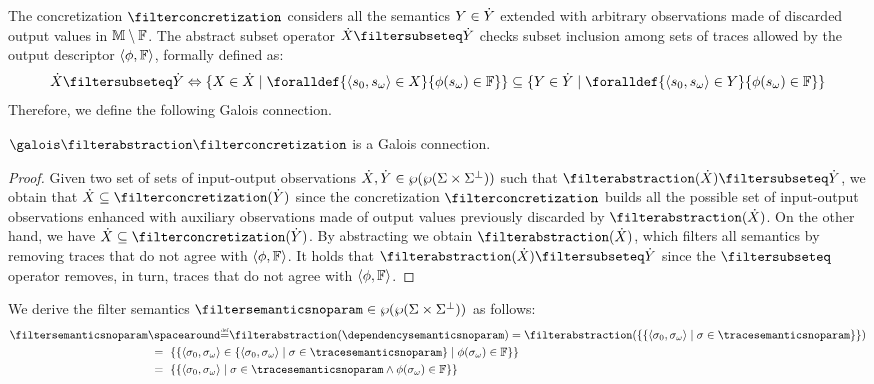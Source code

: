 The concretization $\filterconcretization$ considers all the semantics $Y\in\dot{Y}$ extended with arbitrary observations made of discarded output values in $\mathbb{M}\setminus\mathbb{F}$.
The abstract subset operator $\hiX \filtersubseteq \hiY$ checks subset inclusion among sets of traces allowed by the output descriptor $\langle \phi, \mathbb{F} \rangle$, formally defined as:
\begin{align}
  \labeq{filter-subseteq}
  \hiX \filtersubseteq \hiY \iff
  \setdef{\X\in\hiX}{\foralldef{\inputoutputtuple{\defstate}\in\X}{\reader(\retrieveoutput{\defstate})\in\filter}}
  \subseteq
  \setdef{\Y\in\hiY}{\foralldef{\inputoutputtuple{\defstate}\in\Y}{\reader(\retrieveoutput{\defstate})\in\filter}}
\end{align}
%
Therefore, we define the following Galois connection.
%
\begin{theorem}
  \label{th:dependency-filter-galois}
  $\galoisbetweensemantics{dependency}{filter}$ is a Galois connection.
  \begin{proof}
    Given two set of sets of input-output observations $\dot{X}, \dot{Y}\in\wp(\wp(\Sigma\times\Sigma^\bot))$ such that $\filterabstraction(\hiX)\filtersubseteq \higher{Y}$, we obtain that $\hiX\dependencysubseteq\filterconcretization(\higher{Y})$ since the concretization $\filterconcretization$ builds all the possible set of input-output observations enhanced with auxiliary observations made of output values previously discarded by $\filterabstraction(\hiX)$.
    On the other hand, we have $\hiX\dependencysubseteq\filterconcretization(\higher{Y})$.
    By abstracting we obtain $\filterabstraction(\hiX)$, which filters all semantics by removing traces that do not agree with $\langle \phi, \mathbb{F} \rangle$.
    It holds that $\filterabstraction(\hiX)\filtersubseteq \higher{Y}$ since the $\filtersubseteq$ operator removes, in turn, traces that do not agree with $\langle \phi, \mathbb{F} \rangle$.
  \end{proof}
\end{theorem}
%
We derive the filter semantics $\filtersemanticsnoparam\in\setofsetof\pairofstates$ as follows:
%
\begin{align}
  \labeq{filter}
  \filtersemanticsnoparam &\DefeQ \filterabstraction(\dependencysemanticsnoparam) = \filterabstraction(\{\setdef{
    \inputoutputtuple{\defseq}
  }{
    \defseq\in \tracesemanticsnoparam
  }\}) \\
    &\;=~ \{{\setdef{\inputoutputtuple{\defseq}\in \setdef{
      \inputoutputtuple{\defseq}
    }{
      \defseq\in \tracesemanticsnoparam
    }}{\reader(\retrieveoutput{\defseq})\in\filter}}\} \\
    &\;=~ \{{\setdef{\inputoutputtuple{\defseq}}{\defseq\in \tracesemanticsnoparam\land\reader(\retrieveoutput{\defseq})\in\filter}}\}
\end{align}
